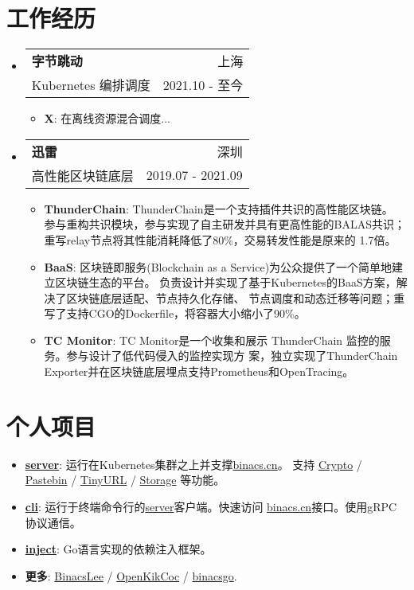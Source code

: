 \documentclass[letterpaper,12pt]{article}
\makeatletter
\newcommand{\resumeItem}[2]{
  \item\small{
    \textbf{#1}{: #2 \vspace{-2pt}}
  }
}
\newcommand{\resumeSubheading}[4]{
  \vspace{-1pt}\item
    \begin{tabular*}{0.97\textwidth}[t]{l@{\extracolsep{\fill}}r}
      \textbf{#1} & #2 \\
      \textup{\small#3} & \textup{\small #4} \\
    \end{tabular*}\vspace{-5pt}
}
\newcommand{\resumeSubItem}[2]{\resumeItem{#1}{#2}\vspace{-4pt}}
\newcommand{\resumeSubHeadingListStart}{\begin{itemize}[leftmargin=*]}
\newcommand{\resumeSubHeadingListEnd}{\end{itemize}}
\newcommand{\resumeItemListStart}{\begin{itemize}}
\newcommand{\resumeItemListEnd}{\end{itemize}\vspace{-5pt}}
\makeatother
\begin{document}
\begin{CJK*}{UTF8}{gbsn}
\section{工作经历}
  \resumeSubHeadingListStart
    \resumeSubheading
      {字节跳动}{上海}
      {Kubernetes 编排调度}{2021.10 - 至今}
      \resumeItemListStart
        \resumeItem{X}
          {在离线资源混合调度...}
      \resumeItemListEnd
    \resumeSubheading
      {迅雷}{深圳}
      {高性能区块链底层}{2019.07 - 2021.09}
      \resumeItemListStart
        \resumeItem{ThunderChain}
          {ThunderChain是一个支持插件共识的高性能区块链。
          参与重构共识模块，参与实现了自主研发并具有更高性能的BALAS共识；
          重写relay节点将其性能消耗降低了80\%，交易转发性能是原来的 1.7倍。}
        \resumeItem{BaaS}
          {区块链即服务(Blockchain as a Service)为公众提供了一个简单地建立区块链生态的平台。
          负责设计并实现了基于Kubernetes的BaaS方案，解决了区块链底层适配、节点持久化存储、
          节点调度和动态迁移等问题；重写了支持CGO的Dockerfile，将容器大小缩小了90\%。}
        \resumeItem{TC Monitor}
          {TC Monitor是一个收集和展示 ThunderChain 监控的服务。参与设计了低代码侵入的监控实现方
          案，独立实现了ThunderChain Exporter并在区块链底层埋点支持Prometheus和OpenTracing。}
      \resumeItemListEnd
  \resumeSubHeadingListEnd

\section{个人项目}
  \resumeSubHeadingListStart
    \resumeSubItem{\href{https://github.com/BinacsLee/server}{server}}
      {运行在Kubernetes集群之上并支撑\href{https://binacs.cn/}{binacs.cn}。
      支持   \href{https://binacs.cn/toys/crypto}{Crypto} / 
                \href{https://binacs.cn/toys/pastebin}{Pastebin} / 
                \href{https://binacs.cn/toys/tinyurl}{TinyURL} / 
                \href{https://binacs.cn/toys/storage}{Storage}
      等功能。}
    \resumeSubItem{\href{https://github.com/BinacsLee/cli}{cli}}
      {运行于终端命令行的\href{https://github.com/BinacsLee/server}{server}客户端。快速访问
      \href{https://binacs.cn/}{binacs.cn}接口。使用gRPC协议通信。}
    \resumeSubItem{\href{https://github.com/binacsgo/inject}{inject}}
      {Go语言实现的依赖注入框架。}
    \resumeSubItem{更多}
      {\href{https://github.com/BinacsLee}{BinacsLee} /
       \href{https://github.com/OpenKikCoc}{OpenKikCoc} /
       \href{https://github.com/binacsgo}{binacsgo}.}
  \resumeSubHeadingListEnd

\end{CJK*}
\end{document}

